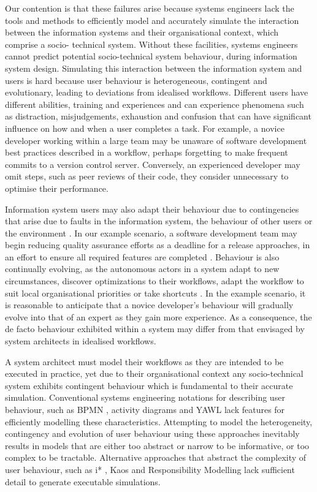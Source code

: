 \documentclass{llncs}
\begin{document}
Our contention is that these failures arise because systems engineers lack the tools and methods to efficiently model
and accurately simulate the interaction between the information systems and their organisational context, which comprise
a socio- technical system. Without these facilities, systems engineers cannot predict potential socio-technical system
behaviour, during information system design. Simulating this interaction between the information system and users is
hard because user behaviour is heterogeneous, contingent and evolutionary, leading to deviations from idealised
workflows.  Different users have different abilities, training and experiences and can experience phenomena such as
distraction, misjudgements, exhaustion and confusion that can have significant influence on how and when a user completes
a task.  For example, a novice developer working within a large team may be unaware of software development best
practices described in a workflow, perhaps forgetting to make frequent commits to a version control server.  Conversely,
an experienced developer may omit steps, such as peer reviews of their code, they consider unnecessary to optimise their
performance.

Information system users may also adapt their behaviour due to contingencies that arise due to faults in the information
system, the behaviour of other users or the environment \citep{sommerville09deriving}.  In our example scenario, a
software development team may begin reducing quality assurance efforts as a deadline for a release approaches, in an
effort to ensure all required features are completed \citep{beck02test}. Behaviour is also continually evolving, as the
autonomous actors in a system adapt to new circumstances, discover optimizations to their workflows, adapt the workflow
to suit local organisational priorities or take shortcuts \citep{bonen79evolutionary}.  In the example scenario, it is
reasonable to anticipate that a novice developer's behaviour will gradually evolve into that of an expert as they gain
more experience.  As a consequence, the de facto behaviour exhibited within a system may differ from that envisaged by
system architects in idealised workflows.

A system architect must model their workflows as they are intended to be executed in practice, yet due to their
organisational context any socio-technical system exhibits contingent behaviour which is fundamental to their accurate
simulation. Conventional systems engineering notations for describing user behaviour, such as BPMN \citep{omg2011omgbpmn},
activity diagrams \citep{omg07omguml} and YAWL \citep{hofstede2010yawl} lack features for efficiently modelling these
characteristics.  Attempting to model the heterogeneity, contingency and evolution of user behaviour using these
approaches inevitably results in models that are either too abstract or narrow to be informative, or too complex to be
tractable.  Alternative approaches that abstract the complexity of user behaviour, such as i* \citep{yu1995social},
Kaos \citep{werneck2009goreistarkaos} and Responsibility Modelling \citep{sommerville09deriving} lack sufficient detail to
generate executable simulations.
\end{document}
